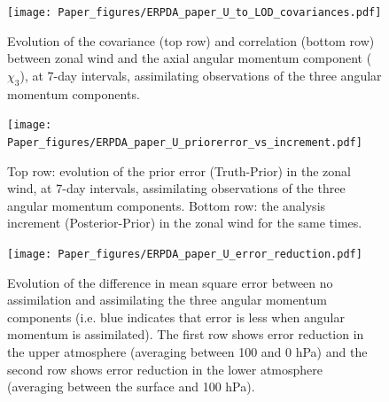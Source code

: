  \begin{figure}
	 \texttt{[image: Paper\_figures/ERPDA\_paper\_U\_to\_LOD\_covariances.pdf]}
	 \caption{Evolution of the covariance (top row) and correlation (bottom row) between zonal wind and the axial angular momentum component ($\chi_3$), at 7-day intervals, assimilating observations of the three angular momentum components.}
 \label{fig:covariances}
\end{figure}

 \begin{figure}
	 \texttt{[image: Paper\_figures/ERPDA\_paper\_U\_priorerror\_vs\_increment.pdf]}
	 \caption{Top row: evolution of the prior error (Truth-Prior) in the zonal wind, at 7-day intervals, assimilating observations of the three angular momentum components. Bottom row: the analysis increment (Posterior-Prior) in the zonal wind for the same times.} 
 \label{fig:error_increments}
\end{figure}

 \begin{figure}
	 \texttt{[image: Paper\_figures/ERPDA\_paper\_U\_error\_reduction.pdf]}
	 \caption{Evolution of the difference in mean square error between no assimilation and assimilating the three angular momentum components (i.e. blue indicates that error is less when angular momentum is assimilated). The first row shows error reduction in the upper atmosphere (averaging between 100 and 0 hPa) and the second row shows error reduction in the lower atmosphere (averaging between the surface and 100 hPa).}
	 \label{fig:ER}
\end{figure}

